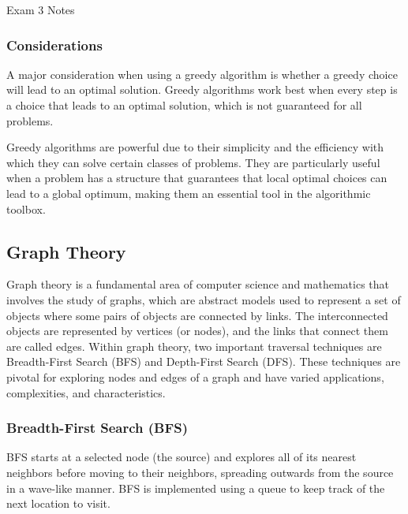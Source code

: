 \begin{examnotes}{Exam 3 Notes}
    \subsubsection*{Considerations}

    A major consideration when using a greedy algorithm is whether a greedy choice will lead to an optimal solution. Greedy algorithms work best when every step is a choice that leads to an optimal 
    solution, which is not guaranteed for all problems. \vspace*{1em}

    Greedy algorithms are powerful due to their simplicity and the efficiency with which they can solve certain classes of problems. They are particularly useful when a problem has a structure that 
    guarantees that local optimal choices can lead to a global optimum, making them an essential tool in the algorithmic toolbox.

    \subsection*{Graph Theory}

    Graph theory is a fundamental area of computer science and mathematics that involves the study of graphs, which are abstract models used to represent a set of objects where some pairs of objects 
    are connected by links. The interconnected objects are represented by vertices (or nodes), and the links that connect them are called edges. Within graph theory, two important traversal techniques 
    are Breadth-First Search (BFS) and Depth-First Search (DFS). These techniques are pivotal for exploring nodes and edges of a graph and have varied applications, complexities, and characteristics.

    \subsubsection*{Breadth-First Search (BFS)}

    BFS starts at a selected node (the source) and explores all of its nearest neighbors before moving to their neighbors, spreading outwards from the source in a wave-like manner. BFS is implemented 
    using a queue to keep track of the next location to visit.


\end{examnotes}
